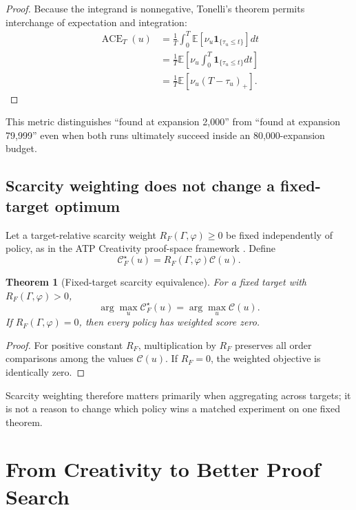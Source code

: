 \documentclass[11pt]{article}
\theoremstyle{datatheorem}
\newtheorem{theorem}{Theorem}[section]
\theoremstyle{definition}
\newcommand{\E}{\mathbb{E}}
\newcommand{\ind}{\mathbf{1}}
\newcommand{\cY}{\mathcal{C}}
\begin{document}
\begin{proof}
Because the integrand is nonnegative, Tonelli's theorem permits interchange of expectation and integration:
\begin{align*}
\operatorname{ACE}_T(u)
&=\frac{1}{T}\int_0^T\E\left[\nu_u\ind_{\{\tau_u\le t\}}\right]dt\\
&=\frac{1}{T}\E\left[\nu_u\int_0^T\ind_{\{\tau_u\le t\}}dt\right]\\
&=\frac{1}{T}\E\left[\nu_u(T-\tau_u)_+\right].
\end{align*}
\end{proof}

This metric distinguishes ``found at expansion 2,000'' from ``found at expansion 79,999'' even when both runs ultimately succeed inside an 80,000-expansion budget.

\subsection{Scarcity weighting does not change a fixed-target optimum}

Let a target-relative scarcity weight $R_F(\Gamma,\varphi)\ge0$ be fixed independently of policy, as in the ATP Creativity proof-space framework \cite{tennesonC1,tennesonCombined}. Define
\[
\cY_F^\star(u)=R_F(\Gamma,\varphi)\cY(u).
\]

\begin{theorem}[Fixed-target scarcity equivalence]\label{thm:scarcity}
For a fixed target with $R_F(\Gamma,\varphi)>0$,
\[
\arg\max_u \cY_F^\star(u)
=
\arg\max_u \cY(u).
\]
If $R_F(\Gamma,\varphi)=0$, then every policy has weighted score zero.
\end{theorem}

\begin{proof}
For positive constant $R_F$, multiplication by $R_F$ preserves all order comparisons among the values $\cY(u)$. If $R_F=0$, the weighted objective is identically zero.
\end{proof}

Scarcity weighting therefore matters primarily when aggregating across targets; it is not a reason to change which policy wins a matched experiment on one fixed theorem.

\section{From Creativity to Better Proof Search}
\end{document}
